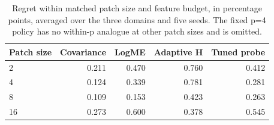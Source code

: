\begin{table}[tb]\centering\small
\caption{Regret within matched patch size and feature budget, in percentage points, averaged over the three domains and five seeds. The fixed p=4 policy has no within-p analogue at other patch sizes and is omitted.}\label{tab:matched}
\begin{tabular}{lrrrr}\toprule
Patch size & Covariance & LogME & Adaptive H & Tuned probe\\\midrule
2 & 0.211 & 0.470 & 0.760 & 0.412\\
4 & 0.124 & 0.339 & 0.781 & 0.281\\
8 & 0.109 & 0.153 & 0.423 & 0.263\\
16 & 0.273 & 0.600 & 0.378 & 0.545\\
\bottomrule\end{tabular}
\end{table}
